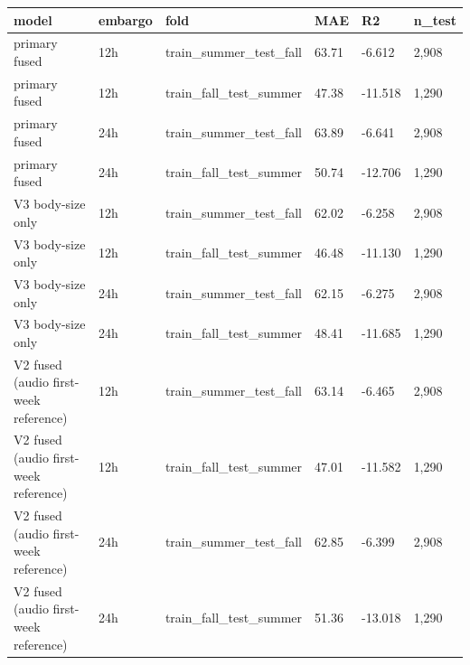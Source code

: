 \begin{tabular}{llllll}
\hline
model & embargo & fold & MAE & R2 & n\_test \\
\hline
primary fused & 12h & train\_summer\_test\_fall & 63.71 & -6.612 & 2,908 \\
primary fused & 12h & train\_fall\_test\_summer & 47.38 & -11.518 & 1,290 \\
primary fused & 24h & train\_summer\_test\_fall & 63.89 & -6.641 & 2,908 \\
primary fused & 24h & train\_fall\_test\_summer & 50.74 & -12.706 & 1,290 \\
V3 body-size only & 12h & train\_summer\_test\_fall & 62.02 & -6.258 & 2,908 \\
V3 body-size only & 12h & train\_fall\_test\_summer & 46.48 & -11.130 & 1,290 \\
V3 body-size only & 24h & train\_summer\_test\_fall & 62.15 & -6.275 & 2,908 \\
V3 body-size only & 24h & train\_fall\_test\_summer & 48.41 & -11.685 & 1,290 \\
V2 fused (audio first-week reference) & 12h & train\_summer\_test\_fall & 63.14 & -6.465 & 2,908 \\
V2 fused (audio first-week reference) & 12h & train\_fall\_test\_summer & 47.01 & -11.582 & 1,290 \\
V2 fused (audio first-week reference) & 24h & train\_summer\_test\_fall & 62.85 & -6.399 & 2,908 \\
V2 fused (audio first-week reference) & 24h & train\_fall\_test\_summer & 51.36 & -13.018 & 1,290 \\
\hline
\end{tabular}

